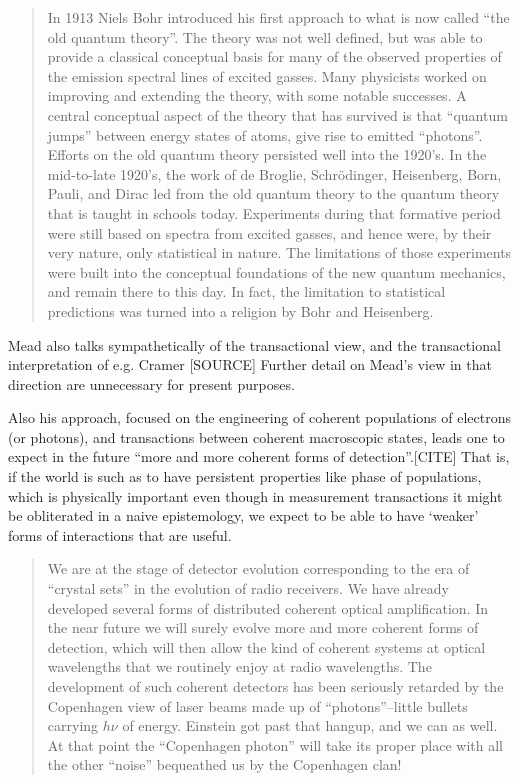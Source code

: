 \begin{quote}
    In 1913 Niels Bohr introduced his first approach to what is now called ``the old quantum theory''. The theory was not well defined, but was able to provide a classical conceptual basis for many of the observed properties of the emission spectral lines of excited gasses. Many physicists worked on improving and extending the theory, with some notable successes. A central conceptual aspect of the theory that has survived is that ``quantum jumps'' between energy states of atoms, give rise to emitted ``photons''. Efforts on the old quantum theory persisted well into the 1920’s. In the mid-to-late 1920’s, the work of de Broglie, Schr\"odinger, Heisenberg, Born, Pauli, and Dirac led from the old quantum theory to the quantum theory that is taught in schools today. Experiments during that formative period were still based on spectra from excited gasses, and hence were, by their very nature, only statistical in nature. The limitations of those experiments were built into the conceptual foundations of the new quantum mechanics, and remain there to this day. In fact, the limitation to statistical predictions was turned into a religion by Bohr and Heisenberg.
\end{quote}

Mead also talks sympathetically of the transactional view, and the transactional interpretation of e.g. Cramer [SOURCE]  Further detail on Mead's view in that direction are unnecessary for present purposes.


Also his approach, focused on the engineering of coherent populations of electrons (or photons), and transactions between coherent macroscopic states, leads one to expect in the future ``more and more coherent forms of detection''.[CITE]  That is, if the world is such as to have persistent properties like phase of populations, which is physically important even though in measurement transactions it might be obliterated in a naive epistemology, we expect to be able to have `weaker' forms of interactions that are useful.  

\begin{quote}
    We are at the stage of detector evolution corresponding to the era of ``crystal sets'' in the evolution of radio receivers. We have already developed several forms of distributed coherent optical amplification. In the near future we will surely evolve more and more coherent forms of detection, which will then allow the kind of coherent systems at optical wavelengths that we routinely enjoy at radio wavelengths. The development of such coherent detectors has been seriously retarded by the Copenhagen view of laser beams made up of ``photons''–little bullets carrying $h\nu$ of energy. Einstein got past that hangup, and we can as well. At that point the ``Copenhagen photon'' will take its proper place with all the other ``noise'' bequeathed us by the Copenhagen clan!
\end{quote}


